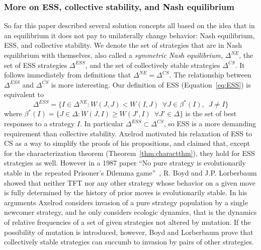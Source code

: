 \subsubsection{More on ESS, collective stability, and Nash equilibrium}
So far this paper described several solution concepts all based on the idea that in an equilibrium it does not pay to unilaterally change behavior: Nash equilibrium, ESS, and collective stability. We denote the set of strategies that are in Nash equilibrium with themselves, also called a \textit{symmetric Nash equilibrium,} $\Delta^{NE}$, the set of ESS strategies $\Delta^{ESS}$, and the set of collectively stable strategies $\Delta^{CS}$. It follows immediately from definitions that $\Delta^{NE} = \Delta^{CS}$. The relationship between $\Delta^{ESS}$ and $\Delta^{CS}$ is more interesting. Our definition of ESS (Equation~\ref{eq:ESS}) is equivalent to
\[
\Delta^{ESS} = \{I \in \Delta^{NE} : W(J, J) < W(I, J) \enspace \forall J \in \beta^*(I),\enspace J\neq I \}
\]
where $\beta^*(I) = \{J \in \Delta : W(J, I) \geq W(J', I) \enspace \forall J' \in \Delta\}$ is the set of best responses to a strategy $I$. In particular $\Delta^{ESS} \subset \Delta^{CS}$, so ESS is a more demanding requirement than collective stability. Axelrod motivated his relaxation of ESS to CS as a way to simplify the proofs of his propositions, and claimed that, except for the characterization theorem (Theorem~\ref{thm:charactthm}), they hold for ESS strategies as well. However in a 1987 paper ``No pure strategy is evolutionarily stable in the repeated Prisoner's Dilemma game''~\cite{Boyd_Lorberbaum_1987}, R. Boyd and J.P. Lorberbaum showed that neither TFT nor any other strategy whose behavior on a given move is fully determined by the history of prior moves is evolutionarily stable. In his arguments Axelrod considers invasion of a pure strategy population by a single newcomer strategy, and he only considers ecologic dynamics, that is the dynamics of relative frequencies of a set of given strategies not altered by mutation. If the possibility of mutation is introduced, however, Boyd and Lorberbaum prove that collectively stable strategies can succumb to invasion by pairs of other strategies.

